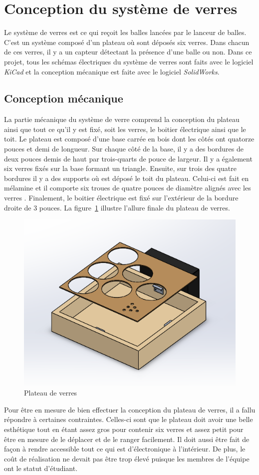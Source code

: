 \section{Conception du système de verres}

Le système de verres est ce qui reçoit les balles lancées par le lanceur de balles.
C’est un système composé d’un plateau où sont déposés six verres.
Dans chacun de ces verres, il y a un capteur détectant la présence d’une balle ou non.
Dans ce projet, tous les schémas électriques du système de verres sont faits avec le logiciel \emph{KiCad} et la conception mécanique est faite avec le logiciel \emph{SolidWorks}.

\subsection{Conception mécanique}

La partie mécanique du système de verre comprend la conception du plateau ainsi que tout ce qu’il y est fixé, soit les verres, le boitier électrique ainsi que le toit.
Le plateau est composé d’une base carrée en bois dont les côtés ont quatorze pouces et demi de longueur.
Sur chaque côté de la base, il y a des bordures de deux pouces demis de haut par trois-quarts de pouce de largeur.
Il y a également six verres fixés sur la base formant un triangle.
Ensuite, sur trois des quatre bordures il y a des supports où est déposé le toit du plateau.
Celui-ci est fait en mélamine et il comporte six troues de quatre pouces de diamètre alignés avec les verres \cite{dimensions.guide_beer_2019}.
Finalement, le boitier électrique est fixé sur l’extérieur de la bordure droite de 3 pouces.
La figure~\ref{fig:s2-verre-Figure1} illustre l’allure finale du plateau de verres.

\begin{figure}[h!]
    \centering
    \includegraphics[width=0.4\linewidth]{img/s2/verre/Figure1}
    \caption{Plateau de verres}
    \label{fig:s2-verre-Figure1}
\end{figure}

Pour être en mesure de bien effectuer la conception du plateau de verres, il a fallu répondre à certaines contraintes.
Celles-ci sont que le plateau doit avoir une belle esthétique tout en étant assez gros pour contenir six verres et assez petit pour être en mesure de le déplacer et de le ranger facilement.
Il doit aussi être fait de façon à rendre accessible tout ce qui est d’électronique à l’intérieur.
De plus, le coût de réalisation ne devait pas être trop élevé puisque les membres de l’équipe ont le statut d’étudiant.

